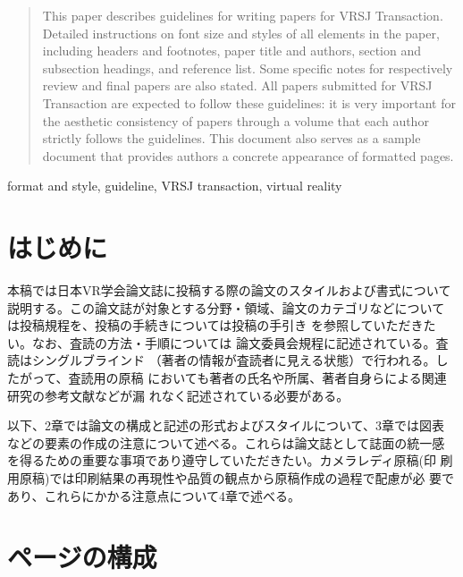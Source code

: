 \documentclass[a4paper,twoside]{jarticle}
\begin{document}

\begin{abstract}
This paper describes guidelines for writing papers for VRSJ
Transaction. Detailed instructions on font size and styles of all
elements in the paper, including headers and footnotes, paper title
and authors, section and subsection headings, and reference list. Some
specific notes for respectively review and final papers are also
stated. All papers submitted for VRSJ Transaction are expected to
follow these guidelines: it is very important for the aesthetic
consistency of papers through a volume that each author strictly
follows the guidelines. This document also serves as a sample document
that provides authors a concrete appearance of formatted pages.
\end{abstract}

\begin{keyword}	
format and style, guideline, VRSJ transaction, virtual reality
\end{keyword}

\maketitle	

\section{はじめに}

本稿では日本VR学会論文誌に投稿する際の論文のスタイルおよび書式について
説明する。この論文誌が対象とする分野・領域、論文のカテゴリなどについて
は投稿規程\cite{toukou}を、投稿の手続きについては投稿の手引き
\cite{tebiki}を参照していただきたい。なお、査読の方法・手順については
論文委員会規程\cite{iinkai}に記述されている。査読はシングルブラインド
（著者の情報が査読者に見える状態）で行われる。したがって、査読用の原稿
においても著者の氏名や所属、著者自身らによる関連研究の参考文献などが漏
れなく記述されている必要がある。

以下、2章では論文の構成と記述の形式およびスタイルについて、3章では図表
などの要素の作成の注意について述べる。これらは論文誌として誌面の統一感
を得るための重要な事項であり遵守していただきたい。カメラレディ原稿(印
刷用原稿)では印刷結果の再現性や品質の観点から原稿作成の過程で配慮が必
要であり、これらにかかる注意点について4章で述べる。

\section{ページの構成}
\end{document}
